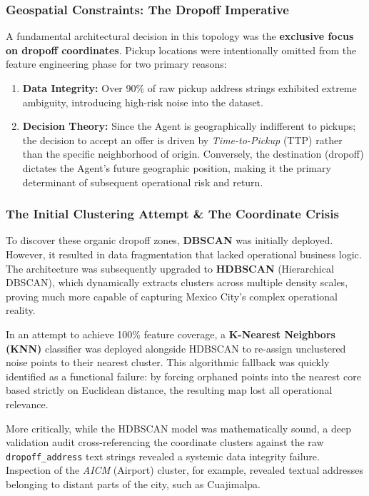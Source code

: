 \subsubsection{Geospatial Constraints: The Dropoff Imperative}
A fundamental architectural decision in this topology was the \textbf{exclusive focus on dropoff coordinates}. Pickup locations were intentionally omitted from the feature engineering phase for two primary reasons:
\begin{enumerate}[noitemsep, topsep=3pt]
    \item \textbf{Data Integrity:} Over 90\% of raw pickup address strings exhibited extreme ambiguity, introducing high-risk noise into the dataset.
    \item \textbf{Decision Theory:} Since the Agent is geographically indifferent to pickups; the decision to accept an offer is driven by \textit{Time-to-Pickup} (TTP) rather than the specific neighborhood of origin. Conversely, the destination (dropoff) dictates the Agent's future geographic position, making it the primary determinant of subsequent operational risk and return.
\end{enumerate}

\subsubsection{The Initial Clustering Attempt \& The Coordinate Crisis}
To discover these organic dropoff zones, \textbf{DBSCAN} was initially deployed. However, it resulted in data fragmentation that lacked operational business logic. The architecture was subsequently upgraded to \textbf{HDBSCAN} (Hierarchical DBSCAN), which dynamically extracts clusters across multiple density scales, proving much more capable of capturing Mexico City's complex operational reality. 

In an attempt to achieve 100\% feature coverage, a \textbf{K-Nearest Neighbors (KNN)} classifier was deployed alongside HDBSCAN to re-assign unclustered noise points to their nearest cluster. This algorithmic fallback was quickly identified as a functional failure: by forcing orphaned points into the nearest core based strictly on Euclidean distance, the resulting map lost all operational relevance. 

More critically, while the HDBSCAN model was mathematically sound, a deep validation audit cross-referencing the coordinate clusters against the raw \texttt{dropoff\_address} text strings revealed a systemic data integrity failure. Inspection of the \textit{AICM} (Airport) cluster, for example, revealed textual addresses belonging to distant parts of the city, such as Cuajimalpa. 

